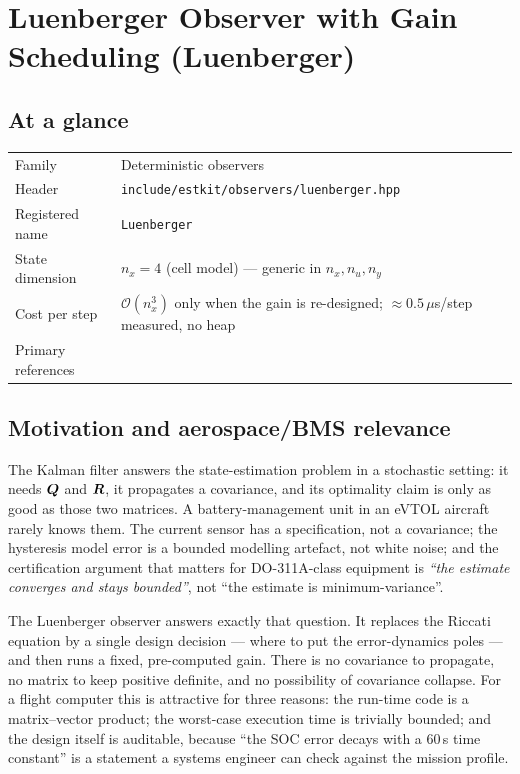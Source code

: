 \chapter{Luenberger Observer with Gain Scheduling (Luenberger)}
\label{ch:luenberger}

\section*{At a glance}
\begin{tabular}{@{}l>{\raggedright\arraybackslash}p{}@{}}
Family & Deterministic observers \\
Header & \texttt{include/estkit/observers/luenberger.hpp} \\
Registered name & \texttt{Luenberger} \\
State dimension & $n_x = 4$ (cell model) --- generic in $n_x, n_u, n_y$ \\
Cost per step & $\mathcal{O}(n_x^3)$ only when the gain is re-designed; $\approx 0.5\,\mu$s/step measured, no heap \\
Primary references & \cite{luenberger1964,luenberger1971,ackermann1972,ogata2010,franklin1998digital} \\
\end{tabular}

\section{Motivation and aerospace/BMS relevance}
The Kalman filter answers the state-estimation problem in a stochastic setting: it needs
$\bm{Q}$ and $\bm{R}$, it propagates a covariance, and its optimality claim is only as good as those
two matrices.  A battery-management unit in an eVTOL aircraft rarely knows them.  The current
sensor has a specification, not a covariance; the hysteresis model error is a bounded modelling
artefact, not white noise; and the certification argument that matters for
DO-311A-class equipment \cite{rtca2017do311a} is \emph{``the estimate converges and stays
bounded''}, not ``the estimate is minimum-variance''.

The Luenberger observer \cite{luenberger1964,luenberger1971} answers exactly that question.  It
replaces the Riccati equation by a single design decision --- where to put the error-dynamics
poles --- and then runs a fixed, pre-computed gain.  There is no covariance to propagate, no
matrix to keep positive definite, and no possibility of covariance collapse.  For a flight
computer this is attractive for three reasons: the run-time code is a matrix--vector product;
the worst-case execution time is trivially bounded; and the design itself is auditable, because
``the SOC error decays with a 60\,s time constant'' is a statement a systems engineer can check
against the mission profile.

